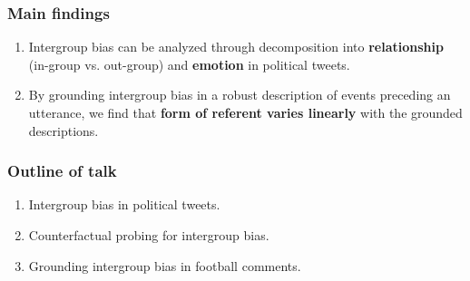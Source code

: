\begin{frame}[c]\frametitle{Main findings}

    \begin{enumerate}
        \itemsep=\baselineskip
        \item Intergroup bias can be analyzed through decomposition into \textbf{relationship} (in-group vs. out-group) and \textbf{emotion} in political tweets.\pause
        \item By grounding intergroup bias in a robust description of events preceding an utterance, we find that \textbf{form of referent varies linearly} with the grounded descriptions.
    \end{enumerate}

\end{frame}


\begin{frame}[c]\frametitle{Outline of talk}

\begin{enumerate}
    \itemsep=\baselineskip
    \item Intergroup bias in political tweets.\pause
    \item Counterfactual probing for intergroup bias.\pause
    \item Grounding intergroup bias in football comments.
\end{enumerate}

\end{frame}
